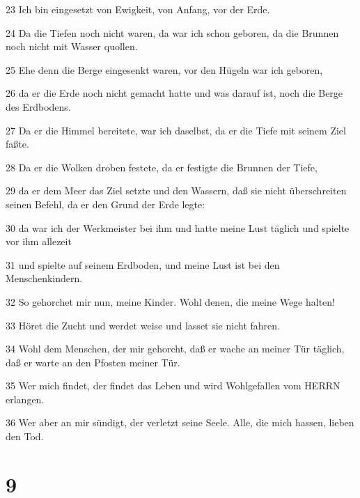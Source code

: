 \par 23 Ich bin eingesetzt von Ewigkeit, von Anfang, vor der Erde.
\par 24 Da die Tiefen noch nicht waren, da war ich schon geboren, da die Brunnen noch nicht mit Wasser quollen.
\par 25 Ehe denn die Berge eingesenkt waren, vor den Hügeln war ich geboren,
\par 26 da er die Erde noch nicht gemacht hatte und was darauf ist, noch die Berge des Erdbodens.
\par 27 Da er die Himmel bereitete, war ich daselbst, da er die Tiefe mit seinem Ziel faßte.
\par 28 Da er die Wolken droben festete, da er festigte die Brunnen der Tiefe,
\par 29 da er dem Meer das Ziel setzte und den Wassern, daß sie nicht überschreiten seinen Befehl, da er den Grund der Erde legte:
\par 30 da war ich der Werkmeister bei ihm und hatte meine Lust täglich und spielte vor ihm allezeit
\par 31 und spielte auf seinem Erdboden, und meine Lust ist bei den Menschenkindern.
\par 32 So gehorchet mir nun, meine Kinder. Wohl denen, die meine Wege halten!
\par 33 Höret die Zucht und werdet weise und lasset sie nicht fahren.
\par 34 Wohl dem Menschen, der mir gehorcht, daß er wache an meiner Tür täglich, daß er warte an den Pfosten meiner Tür.
\par 35 Wer mich findet, der findet das Leben und wird Wohlgefallen vom HERRN erlangen.
\par 36 Wer aber an mir sündigt, der verletzt seine Seele. Alle, die mich hassen, lieben den Tod.

\chapter{9}

